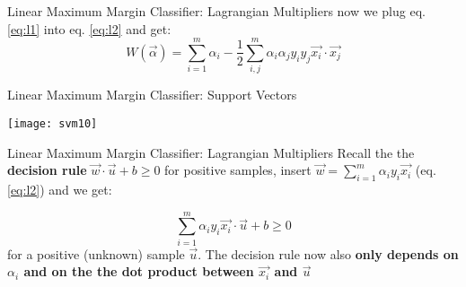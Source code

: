 \documentclass{beamer}
\begin{document}
\begin{frame}{Linear Maximum Margin Classifier: Lagrangian Multipliers}
now we plug eq. \ref{eq:l1} into eq. \ref{eq:l2} and get:
\begin{equation}
W(\vec{\alpha}) = \sum_{i=1}^m \alpha_i - \frac{1}{2}\sum_{i,j}^m \alpha_i \alpha_j y_i y_j \vec{x_i} \cdot \vec{x_j}
\end{equation}
\begin{itemize}


\end{itemize}
\end{frame}

\begin{frame}{Linear Maximum Margin Classifier: Support Vectors}
\begin{center}
\texttt{[image: svm10]}
\end{center}
\end{frame}


\begin{frame}{Linear Maximum Margin Classifier: Lagrangian Multipliers}
Recall the the \textbf{decision rule} $\vec{w}\cdot\vec{u}+b \geq 0$ for positive samples, insert $\vec{w} = \sum_{i=1}^{m} \alpha_i y_i \vec{x_i}$ (eq. \ref{eq:l2}) and we get:

$$\sum_{i=1}^{m}\alpha_i y_i \vec{x_i} \cdot \vec{u} + b \geq 0 $$ for a positive (unknown) sample $\vec{u}$.
The decision rule now also \textbf{only depends on $\alpha_i$ and on the the dot product between $\vec{x_i}$ and $\vec{u}$}\\
\end{frame}
\end{document}
